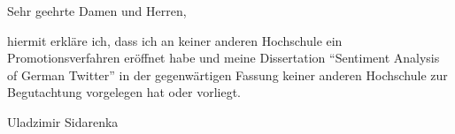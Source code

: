 \documentclass[12pt]{dinbrief}
\newcommand{\wowa}{Uladzimir Sidarenka}
\newcommand{\sgdh}{Sehr geehrte Damen und Herren}
\begin{document}
\begin{letter}
  \addresshigh
  \nowindowrules %
  \nobackaddressrule %

  \date{\today}
  \subject{\textbf{Erkl\"arung bez\"uglich anderer Promotionsversuche}}
  \opening{\sgdh,}

  hiermit erkl\"are ich, dass ich an keiner anderen Hochschule ein
  Promotionsverfahren er\"offnet habe und meine Dissertation
  ``Sentiment Analysis of German Twitter'' in der gegenw\"artigen
  Fassung keiner anderen Hochschule zur Begutachtung vorgelegen hat
  oder vorliegt.

  \bigskip
  \hfill\wowa
\end{letter}
\end{document}
